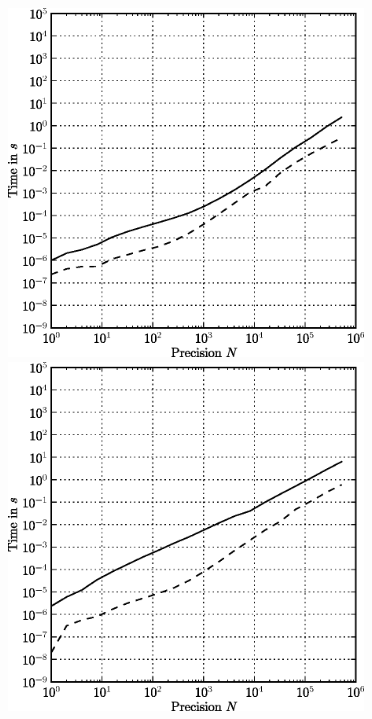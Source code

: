 \begin{figure}[ht]
\begin{minipage}[t]{0.5\linewidth}
\centering
\includegraphics[width=0.84\textwidth]{bin/qp-sqrt}
\end{minipage}
\begin{minipage}[t]{0.5\linewidth}
\centering
\includegraphics[width=0.84\textwidth]{bin/qp-teichmuller}
\end{minipage}\\


\end{figure}
